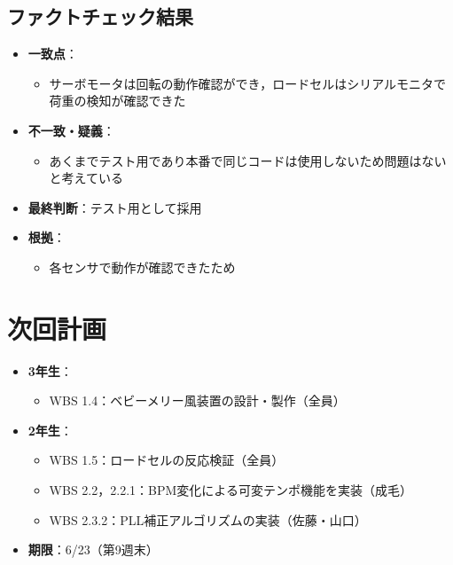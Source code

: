 \documentclass[a4paper,12pt]{ltjsarticle}
\begin{document}
\subsection{ファクトチェック結果}
\begin{itemize}
  \item \textbf{一致点}：
    \begin{itemize}
      \item サーボモータは回転の動作確認ができ，ロードセルはシリアルモニタで荷重の検知が確認できた
    \end{itemize}
  \item \textbf{不一致・疑義}：
    \begin{itemize}
      \item あくまでテスト用であり本番で同じコードは使用しないため問題はないと考えている
    \end{itemize}
  \item \textbf{最終判断}：テスト用として採用
  \item \textbf{根拠}：
    \begin{itemize}
      \item 各センサで動作が確認できたため
    \end{itemize}
\end{itemize}

\section{次回計画}

\begin{itemize}
  \item \textbf{3年生}：
    \begin{itemize}
      \item WBS 1.4：ベビーメリー風装置の設計・製作（全員）
    \end{itemize}
  \item \textbf{2年生}：
    \begin{itemize}
      \item WBS 1.5：ロードセルの反応検証（全員）
      \item WBS 2.2，2.2.1：BPM変化による可変テンポ機能を実装（成毛）
      \item WBS 2.3.2：PLL補正アルゴリズムの実装（佐藤・山口）
    \end{itemize}
  \item \textbf{期限}：6/23（第9週末）
\end{itemize}
\end{document}
